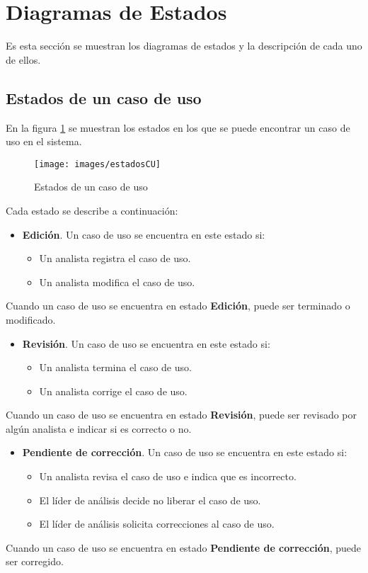 \section{Diagramas de Estados}
\label{sec:diagramaEstados}

Es esta sección se muestran los diagramas de estados y la descripción de cada uno de ellos.

\subsection{Estados de un caso de uso}

En la figura \ref{estadosCU} se muestran los estados en los que se puede encontrar un caso de uso en el sistema.

	\begin{figure}[H]
		\texttt{[image: images/estadosCU]}
		\caption{Estados de un caso de uso}
		\label{estadosCU}
	\end{figure}

	Cada estado se describe a continuación:
	\begin{itemize}
		\item \textbf{Edición}. Un caso de uso se encuentra en este estado si:
			\begin{itemize}
				\item Un analista registra el caso de uso.
				\item Un analista modifica el caso de uso.
			\end{itemize}
	\end{itemize}
	Cuando un caso de uso se encuentra en estado \textbf{Edición}, puede ser terminado o modificado.
	
	\begin{itemize}
		\item \textbf{Revisión}. Un caso de uso se encuentra en este estado si:
		\begin{itemize}
			\item Un analista termina el caso de uso.
			\item Un analista corrige el caso de uso.
		\end{itemize}
	\end{itemize}
	Cuando un caso de uso se encuentra en estado \textbf{Revisión}, puede ser revisado por algún analista e indicar si es correcto o no.
	
	\begin{itemize}
		\item \textbf{Pendiente de corrección}. Un caso de uso se encuentra en este estado si:
		\begin{itemize}
			\item Un analista revisa el caso de uso e indica que es incorrecto.
			\item El líder de análisis decide no liberar el caso de uso.
			\item El líder de análisis solicita correcciones al caso de uso.
		\end{itemize}
	\end{itemize}
	Cuando un caso de uso se encuentra en estado \textbf{Pendiente de corrección}, puede ser corregido.
	
